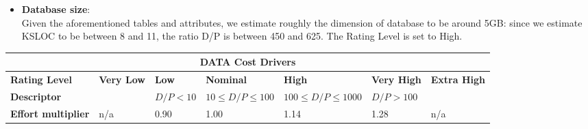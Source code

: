 \begin{itemize}
\item \textbf{Database size}:\\
Given the aforementioned tables and attributes, we estimate roughly the dimension of database to be around 5GB: since we estimate KSLOC to be between 8 and 11, the ratio D/P is between 450 and 625. The Rating Level is set to High.
\end{itemize}
\hspace*{-3cm}\begin{tabular}{|p{3cm}|p{2cm}|p{2cm}|p{2cm}|p{2cm}|p{2cm}|p{2cm}|}
\hline
\multicolumn{7}{|c|}{\textbf{DATA Cost Drivers}}\\
\hline
\hline
\textbf{Rating Level} & \textbf{Very Low} & \textbf{Low} & \textbf{Nominal} & \textbf{High} & \textbf{Very High} & \textbf{Extra High}\\
\hline
\textbf{Descriptor} & & $D/P < 10$ & $10 \leq D/P \leq 100$ & $100 \leq D/P \leq 1000$ & $ D/P > 100$ & \\
\hline
\textbf{Effort multiplier} & n/a & 0.90 & 1.00 & 1.14 & 1.28 & n/a\\
\hline 
\end{tabular}